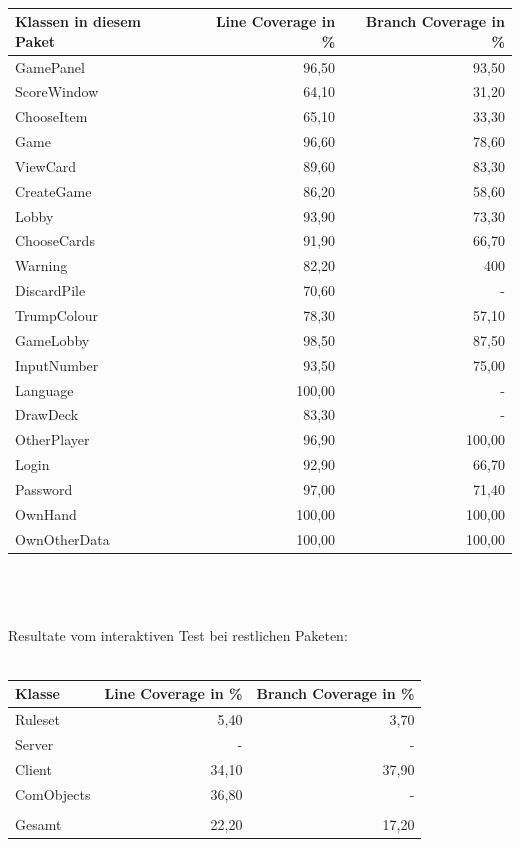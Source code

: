 \documentclass[a4paper]{article}
\begin{document}
\ \\
		
	\noindent
\begin{tabular}{|l|r|r|}
\hline
Klassen in diesem Paket & Line Coverage in \% & Branch Coverage in \% \\ \hline \hline
GamePanel & 96,50 & 93,50 \\ \hline
ScoreWindow & 64,10 & 31,20 \\ \hline
ChooseItem & 65,10 & 33,30 \\ \hline
Game & 96,60 & 78,60 \\ \hline
ViewCard & 89,60 & 83,30 \\ \hline
CreateGame & 86,20 & 58,60 \\ \hline
Lobby & 93,90 & 73,30 \\ \hline
ChooseCards & 91,90 & 66,70 \\ \hline
Warning & 82,20 & 400 \\ \hline
DiscardPile & 70,60 & - \\ \hline
TrumpColour & 78,30 & 57,10 \\ \hline
GameLobby & 98,50 & 87,50 \\ \hline
InputNumber & 93,50 & 75,00 \\ \hline
Language & 100,00 & - \\ \hline
DrawDeck & 83,30 & - \\ \hline
OtherPlayer & 96,90 & 100,00 \\ \hline
Login & 92,90 & 66,70 \\ \hline
Password & 97,00 & 71,40 \\ \hline
OwnHand & 100,00 & 100,00 \\ \hline
OwnOtherData & 100,00 & 100,00 \\ \hline
\end{tabular}
 \ \\ \ \\ \ \\
 	Resultate vom interaktiven Test bei restlichen Paketen: \\\\
 	\noindent
 	\begin{tabular}{|l|r|r|}\hline
 	Klasse & Line Coverage in \% & Branch Coverage in \% \\ \hline \hline
Ruleset & 5,40 & 3,70 \\ \hline
Server & - & - \\ \hline
Client & 34,10 & 37,90 \\ \hline
ComObjects & 36,80 & - \\ \hline
 &  &  \\ \hline
Gesamt & 22,20 & 17,20 \\ \hline
\end{tabular}
\end{document}
